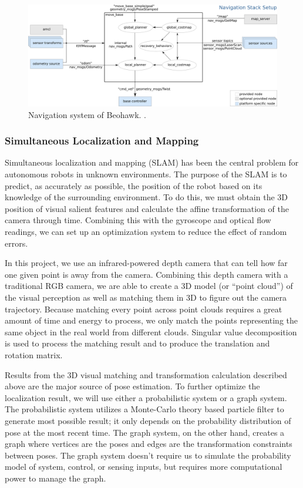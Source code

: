 \documentclass[12pt, letterpaper]{article}
\begin{document}
\begin{figure}[h]
\centering
\includegraphics[width=12cm]{images/overview_tf.png}
\caption{Navigation system of Beohawk. .} 
\label{fig:navi}
\end{figure}

\subsubsection{Simultaneous Localization and Mapping}

Simultaneous localization and mapping (SLAM) has been the central problem for autonomous robots in unknown environments. The purpose of the SLAM is to predict, as accurately as possible, the position of the robot based on its knowledge of the surrounding environment.  To do this, we must obtain the 3D position of visual salient features and calculate the affine transformation of the camera through time. Combining this with the gyroscope and optical flow readings, we can set up an optimization system to reduce the effect of random errors.

In this project, we use an infrared-powered depth camera that can tell how far one given point is away from the camera. Combining this depth camera with a traditional RGB camera, we are able to create a 3D model (or ``point cloud'') of the visual perception as well as matching them in 3D to figure out the camera trajectory. Because matching every point across point clouds requires a great amount of time and energy to process, we only match the points representing the same object in the real world from different clouds. Singular value decomposition is used to process the matching result and to produce the translation and rotation matrix.

Results from the 3D visual matching and transformation calculation described above are the major source of pose estimation. To further optimize the localization result, we will use either a probabilistic system or a graph system. The probabilistic system utilizes a Monte-Carlo theory based particle filter to generate most possible result; it only depends on the probability distribution of pose at the most recent time. The graph system, on the other hand, creates a graph where vertices are the poses and edges are the transformation constraints between poses. The graph system doesn't require us to simulate the probability model of system, control, or sensing inputs, but requires more computational power to manage the graph.
\end{document}
